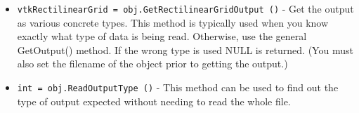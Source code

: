 \begin{itemize}
\item  \verb|vtkRectilinearGrid = obj.GetRectilinearGridOutput ()| -  Get the output as various concrete types. This method is typically used
 when you know exactly what type of data is being read.  Otherwise, use
 the general GetOutput() method. If the wrong type is used NULL is
 returned.  (You must also set the filename of the object prior to
 getting the output.)

\item  \verb|int = obj.ReadOutputType ()| -  This method can be used to find out the type of output expected without
 needing to read the whole file.

\end{itemize}
